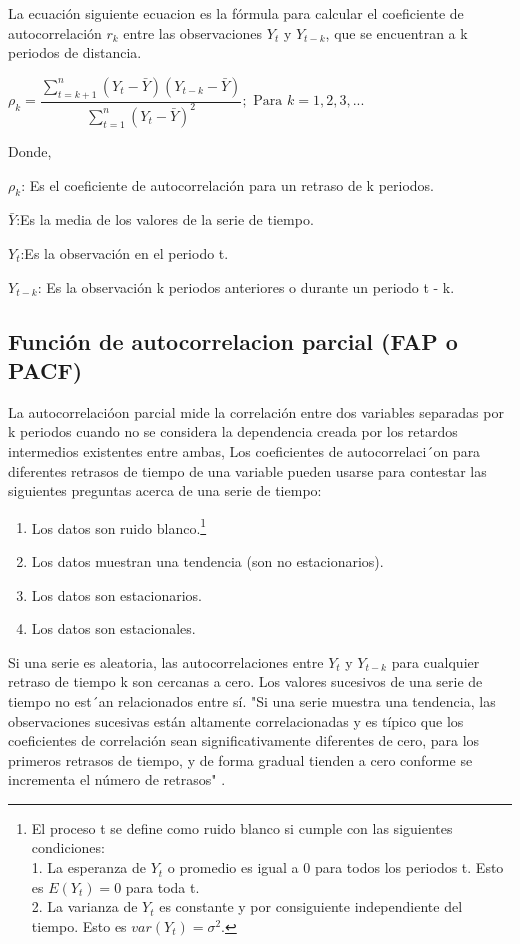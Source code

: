 \documentclass[12pt,letterpaper]{report}
\begin{document}
La ecuación siguiente ecuacion es la fórmula para calcular el coeficiente de autocorrelación $r_k$
entre las observaciones $Y_t$ y $Y_{t-k}$, que se encuentran a k periodos de distancia.

\begin{center}
$\rho_k = \dfrac 
{\sum_{t=k+1}^{n} (Y_t-\bar{Y})(Y_{t-k}-\bar{Y})}
{\sum_{t=1}^{n} (Y_t - \bar{Y})^2}; \mbox{ Para } k = 1,2,3,...$
\end{center}

Donde,

\textbf{$\rho_k$}: Es el coeficiente de autocorrelación para un retraso de k periodos.

\textbf{$\bar{Y}$}:Es la media de los valores de la serie de tiempo.

\textbf{$Y_t$}:Es la observación en el periodo t.

\textbf{$Y_{t-k}$}:  Es la observación k periodos anteriores o durante un periodo t - k.

\subsection{Función de autocorrelacion parcial (FAP o PACF)}

La autocorrelacióon parcial mide la correlación entre dos variables separadas por k periodos cuando no se considera la dependencia creada por los retardos intermedios existentes entre ambas, Los coeficientes de autocorrelaci´on para diferentes retrasos de tiempo de una
variable pueden usarse para contestar las siguientes preguntas acerca de una
serie de tiempo:

\begin{enumerate}
\item  Los datos son ruido blanco.\footnote{El proceso t se define como ruido blanco si cumple con
las siguientes condiciones:\\
1. La esperanza de $Y_t$ o promedio es igual a 0 para todos los periodos t. Esto es $E(Y_t) = 0$ para toda t.\\
2. La varianza de $Y_t$ es constante y por consiguiente independiente del tiempo. Esto es $var(Y_t) = \sigma^2$.}
\item  Los datos muestran una tendencia (son no estacionarios).
\item  Los datos son estacionarios.
\item  Los datos son estacionales.
\end{enumerate}

Si una serie es aleatoria, las autocorrelaciones entre $Y_t$ y $Y_{t-k}$ para cualquier
retraso de tiempo k son cercanas a cero. Los valores sucesivos de una serie
de tiempo no est´an relacionados entre sí. "Si una serie muestra una tendencia,
las observaciones sucesivas están altamente correlacionadas y es típico que
los coeficientes de correlación sean significativamente diferentes de cero, para
los primeros retrasos de tiempo, y de forma gradual tienden a cero conforme
se incrementa el número de retrasos" \cite{Isaac}.
\end{document}

